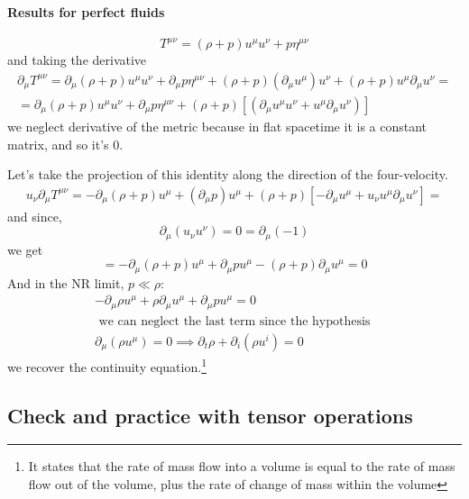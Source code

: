 \paragraph{Results for perfect fluids}
\[
T^{\mu \nu } = \left( \rho  +p \right) u^{\mu }u^{\nu }+p \eta^{\mu \nu }
\]
and taking the derivative
\begin{gather*}
\partial_{\mu } T^{\mu \nu } = \partial_{\mu }\left( \rho +p \right)u^{\mu }u^{\nu } + \partial_{\mu }p \eta^{\mu \nu } + \left( \rho +p \right)\left( \partial_{\mu }u^{\mu } \right)u^{\nu } + \left( \rho +p \right) u^{\mu }\partial_{\mu }u^{\nu } = \\
= \partial_{\mu }\left( \rho +p \right)u^{\mu }u^{\nu }+ \partial_{\mu }p \eta^{\mu \nu } + \left( \rho +p \right) [\left( \partial_{\mu }u^{\mu }u^{\nu } + u^{\mu }\partial_{\mu }u^{\nu } \right)]
\end{gather*}
we neglect derivative of the metric because in flat spacetime it is a constant matrix, and so it's 0.\par
Let's take the projection of this identity along the direction of the four-velocity.
\begin{gather*}
	u_{\nu }\partial_{\mu }T^{\mu \nu } = -\partial_{\mu }\left( \rho +p \right)u^{\mu }+\left( \partial_{\mu }p \right)u^{\mu }+\left( \rho +p \right)[-\partial_{\mu }u^{\mu }+u_{\nu }u^{\mu }\partial_{\mu }u^{\nu }] =
\end{gather*}
and since, 
\[
\partial_{\mu }\left( u_{\nu }u^{\nu } \right) = 0 = \partial_{\mu }\left( -1 \right)
\]
we get
\begin{equation}
= -\partial_{\mu }\left( \rho +p \right)u^{\mu } + \partial_{\mu }p u^{\mu }- \left( \rho +p \right)\partial_{\mu }u^{\mu } = 0
\end{equation}
And in the NR limit, $p\ll \rho $:
\begin{gather*}
-\partial_{\mu }\rho  u^{\mu }+\rho \partial_{\mu }u^{\mu }+ \partial_{\mu }pu^{\mu }=0 \\
\text{ we can neglect the last term since the hypothesis } \\
\partial_{\mu }\left( \rho u^{\mu } \right) = 0 \implies \partial_{t}\rho +\partial_{i}\left( \rho u^{i} \right) = 0
\end{gather*}
we recover the continuity equation.\footnote{It states that the rate of mass flow into a volume is equal to the rate of mass flow out of the volume, plus the rate of change of mass within the volume}

\subsection{Check and practice with tensor operations}


